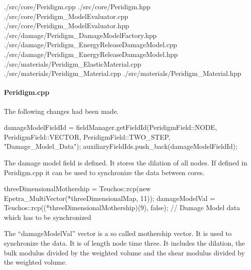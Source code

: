 % 
%               
%          
% 

\begin{code}
./src/core/Peridigm.cpp
./src/core/Peridigm.hpp
./src/core/Peridigm_ModelEvaluator.cpp
./src/core/Peridigm_ModelEvaluator.hpp
./src/damage/Peridigm_DamageModelFactory.hpp
./src/damage/Peridigm_EnergyReleaseDamageModel.cpp
./src/damage/Peridigm_EnergyReleaseDamageModel.hpp
./src/materials/Peridigm_ElasticMaterial.cpp
./src/materials/Peridigm_Material.cpp
./src/materials/Peridigm_Material.hpp
\end{code}
\paragraph{Peridigm.cpp}
The following changes had been made.
\begin{code}
damageModelFieldId = fieldManager.getFieldId(PeridigmField::NODE, 
   PeridigmField::VECTOR, PeridigmField::TWO_STEP, "Damage_Model_Data");
auxiliaryFieldIds.push_back(damageModelFieldId);
\end{code}
The damage model field is defined. It stores the dilation of all nodes. If defined in Peridigm.cpp it can be used to synchronize the data between cores.
\begin{code}
 threeDimensionalMothership = 
 Teuchos::rcp(new Epetra_MultiVector(*threeDimensionalMap, 11));
 damageModelVal = Teuchos::rcp((*threeDimensionalMothership)(9), false);  
 // Damage Model data which has to be synchronized
\end{code}
The ``damageModelVal'' vector is a so called mothership vector. It is used to synchronize the data. It is of length node time three. It includes the dilation, the bulk modulus divided by the weighted volume and the shear modulus divided by the weighted volume.

